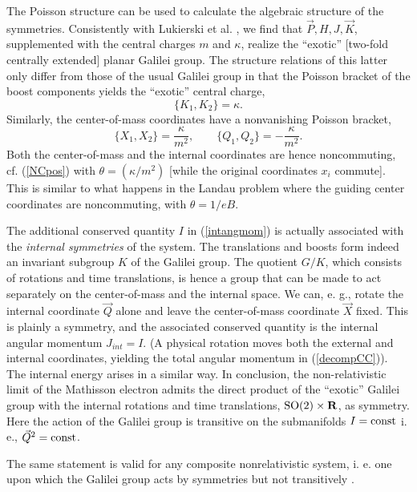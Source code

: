 \documentclass[a4paper,11pt]{article}
\newcommand{\SO}[1]{{\mathop{\rm SO}}({#1})}
\newcommand{\IR}{{\bf R}}
\newcommand{\const}{\mathop{\rm const}\nolimits}
\def\vK{{\vec K}}
\def\vP{{\vec P}}
\def\vQ{{\vec Q}}
\def\vX{{\vec X}}
\begin{document}
The Poisson structure can be used to calculate the
algebraic structure of the symmetries.
Consistently with Lukierski et al. \cite{LSZ},
we find that $\vP, H, J, \vK$, supplemented with the
central charges $m$ and $\kappa$,
realize the ``exotic''
[two-fold centrally extended] planar Galilei group.
The  structure relations of
this latter only differ from those of
the usual Galilei group in that
the Poisson bracket of the boost components yields the
``exotic'' central charge,
\begin{equation}
     \big\{K_{1},K_{2}\big\}=\kappa.
     \label{exoCR}
\end{equation}
Similarly, the center-of-mass coordinates have a nonvanishing
Poisson bracket,
\begin{equation}
     \big\{X_{1},X_{2}\big\}=\frac{\kappa}{m^2},
     \qquad
     \big\{Q_{1},Q_{2}\big\}=-\frac{\kappa}{m^2}.
     \label{NCCR}
\end{equation}
Both the center-of-mass and the internal coordinates are hence
noncommuting, cf. (\ref{NCpos}) with $\theta=(\kappa/m^2)$
[while the original coordinates $x_{i}$ commute].
This is similar to what happens
in the Landau problem where the guiding center coordinates are
noncommuting, with $\theta=1/eB$.

The additional conserved quantity $I$ in
(\ref{intangmom}) is actually associated with
the {\it internal symmetries}  of the system.
The translations and boosts form indeed an invariant
subgroup $K$ of the Galilei group.
The quotient $G/K$, which consists of
rotations and time translations, is hence a group that can be made to
act separately on the center-of-mass and the internal space.
We can, e. g., rotate
the internal coordinate $\vQ$ alone and leave the center-of-mass
coordinate $\vX$ fixed. This is plainly a symmetry,
and the associated conserved quantity is the
internal angular momentum $J_{int}=I$. (A physical rotation
moves both the external and internal coordinates, yielding
the total angular momentum in (\ref{decompCC})).
The internal energy arises in a similar way.
In conclusion, the non-relativistic limit of the
Mathisson electron admits the direct product
of the ``exotic'' Galilei group with the internal
rotations and time translations, $\SO2\times \IR$, as symmetry.
Here the action of the Galilei group is transitive on the
submanifolds $I=\const$ i. e., $\vQ^2=\const$.

The same statement is valid for any composite
nonrelativistic system, i. e. one
upon which the Galilei group acts by symmetries but not
transitively \cite{SSD}.
\end{document}

